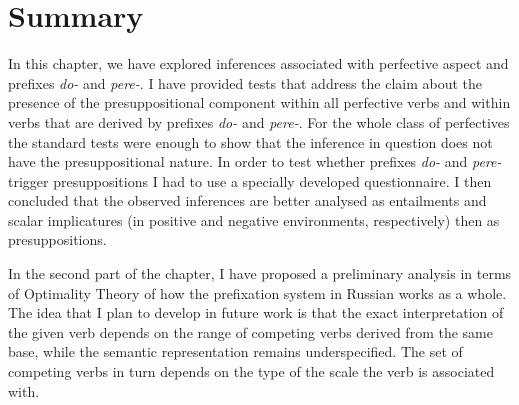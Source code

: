 \section{Summary}
In this chapter, we have explored inferences associated with perfective aspect and prefixes \textit{do-} and \textit{pere-}. I have provided tests that address the claim about the presence of the presuppositional component within all perfective verbs and within verbs that are derived by prefixes \textit{do-} and \textit{pere-}. For the whole class of perfectives the standard tests were enough to show that the inference in question does not have the presuppositional nature. In order to test whether prefixes \textit{do-} and \textit{pere-} trigger presuppositions I had to use a specially developed questionnaire. I then concluded that the observed inferences are better analysed as entailments and scalar implicatures (in positive and negative environments, respectively) then as presuppositions.

In the second part of the chapter, I have proposed a preliminary analysis in terms of Optimality Theory of how the prefixation system in Russian works as a whole. The idea that I plan to develop in future work is that the exact interpretation of the given verb depends on the range of competing verbs derived from the same base, while the semantic representation remains underspecified. The set of competing verbs in turn depends on the type of the scale the verb is associated with.



